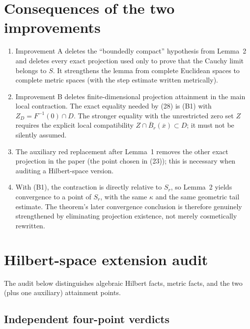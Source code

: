 \documentclass[11pt]{article}
\newcommand{\barx}{\overline{x}}
\begin{document}
\section{Consequences of the two improvements}

\begin{enumerate}
\item Improvement A deletes the ``boundedly compact'' hypothesis from Lemma~2 and deletes every exact projection used only to prove that the Cauchy limit belongs to \(S\). It strengthens the lemma from complete Euclidean spaces to complete metric spaces (with the step estimate written metrically).
\item Improvement B deletes finite-dimensional projection attainment in the main local contraction. The exact equality needed by (28) is (B1) with \(Z_D=F^{-1}(0)\cap D\). The stronger equality with the unrestricted zero set \(Z\) requires the explicit local compatibility \(Z\cap\overline B_r(\barx)\subset D\); it must not be silently assumed.
\item The auxiliary red replacement after Lemma~1 removes the other exact projection in the paper (the point chosen in (23)); this is necessary when auditing a Hilbert-space version.
\item With (B1), the contraction is directly relative to \(S_r\), so Lemma~2 yields convergence to a point of \(S_r\), with the same \(\kappa\) and the same geometric tail estimate. The theorem's later convergence conclusion is therefore genuinely strengthened by eliminating projection existence, not merely cosmetically rewritten.
\end{enumerate}

\section{Hilbert-space extension audit}

The audit below distinguishes algebraic Hilbert facts, metric facts, and the two (plus one auxiliary) attainment points.

\subsection*{Independent four-point verdicts}
\end{document}
